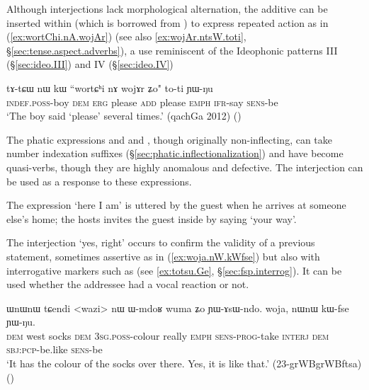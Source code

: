 Although interjections lack morphological alternation, the additive  can be inserted within  (which is borrowed from ) to express repeated action as in (\ref{ex:wortChi.nA.wojAr}) (see also \ref{ex:wojAr.ntsW.toti}, §\ref{sec:tense.aspect.adverbs}), a use reminiscent of the Ideophonic patterns III (§\ref{sec:ideo.III}) and IV (§\ref{sec:ideo.IV})

 \begin{exe}
\ex \label{ex:wortChi.nA.wojAr}
\gll tɤ-tɕɯ nɯ kɯ ``wortɕʰi nɤ wojɤr ʑo" to-ti ɲɯ-ŋu \\
\textsc{indef}.\textsc{poss}-boy \textsc{dem} \textsc{erg} please \textsc{add} please \textsc{emph} \textsc{ifr}-say \textsc{sens}-be \\
\glt `The boy said `please' several times.' (qachGa 2012)
()
\end{exe}

The phatic expressions and  and , though originally non-inflecting, can take number indexation suffixes (§\ref{sec:phatic.inflectionalization}) and have become quasi-verbs, though they are highly anomalous and defective. The interjection  can be used as a response to these expressions.

The expression  `here I am' is uttered by the guest when he arrives at someone else's home; the hosts invites the guest inside by saying  `your way'.

The interjection  `yes, right' occurs to confirm the validity of a previous statement, sometimes assertive as in (\ref{ex:woja.nW.kWfse}) but also with interrogative markers such as  (see \ref{ex:totsu.Ge}, §\ref{sec:fsp.interrog}). It can be used whether the addressee had a vocal reaction or not.

\begin{exe}
\ex \label{ex:woja.nW.kWfse}
\gll ɯnɯnɯ tɕendi <wazi> nɯ ɯ-mdoʁ wuma ʑo ɲɯ-ɤsɯ-ndo. woja, nɯnɯ kɯ-fse ɲɯ-ŋu. \\
\textsc{dem} west socks \textsc{dem} \textsc{3sg}.\textsc{poss}-colour really \textsc{emph} \textsc{sens}-\textsc{prog}-take \textsc{interj} \textsc{dem} \textsc{sbj}:\textsc{pcp}-be.like \textsc{sens}-be \\
\glt `It has the colour of the socks over there. Yes, it is like that.' (23-grWBgrWBftsa)
()
\end{exe} 


